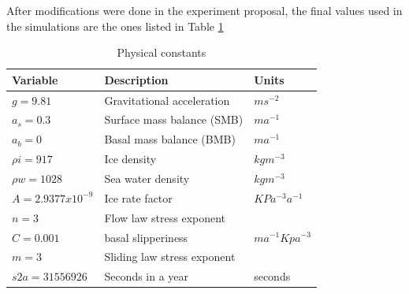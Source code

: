 \documentclass{article}
\begin{document}
After modifications were done in the experiment proposal, the final values used in the simulations are the ones listed in Table \ref{Physical constants}
\begin{table}[!h]
\begin{center}
\caption{Physical constants}
\label{Physical constants}
\begin{tabular}{|l|l|l|}
\hline
Variable          & Description                 & Units           \\ \hline
$g=9.81$         & Gravitational acceleration  & $ms^{-2}$         \\ \hline
$a_s=0.3$       & Surface mass balance (SMB)  & $ma^{-1}$         \\ \hline
$a_b=0$             & Basal mass balance (BMB)    & $ma^{-1}$         \\ \hline
$\rho i=917$        & Ice density                 & $kg m^{-3}$       \\ \hline
$\rho w=1028$      & Sea water density           & $kg m^{-3}$       \\ \hline
$A= 2.9377x10^{-9}$ & Ice rate factor             & $KPa^{-3}a^{-1}$  \\ \hline
$n=3$               & Flow law stress exponent    &                 \\ \hline
$C=0.001$           & basal slipperiness          & $ma^{-1}Kpa^{-3}$ \\ \hline
$m=3$               & Sliding law stress exponent &                 \\ \hline
$s2a=31556926$     & Seconds in a year           & seconds         \\ \hline
\end{tabular}
\end{center}
\end{table}
\end{document}
